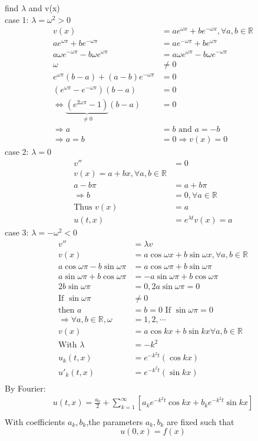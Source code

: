 find $ \lambda $ and v(x)\\
case 1: $ \lambda=\omega^2>0 $\\
\begin{align*}{}{}
v(x)&=ae^{\omega x}+be^{-\omega x},\forall a,b\in\mathbb{R}\\
ae^{\omega \pi}+be^{-\omega \pi}&=ae^{-\omega \pi}+be^{\omega \pi}\\
a\omega e^{-\omega \pi}-b\omega e^{\omega \pi}&=a\omega e^{\omega \pi}-b\omega e^{-\omega \pi}\\
\omega &\neq0\\
e^{\omega \pi}(b-a)+(a-b)e^{-\omega \pi}&=0\\
(e^{\omega \pi}-e^{-\omega \pi})(b-a)&=0\\
\Leftrightarrow \underbrace{(e^{2\omega \pi}-1)}_{\neq 0}(b-a)&=0\\
\Rightarrow a&=b \text{ and } a=-b\\
\Rightarrow a=b&=0 \Rightarrow v(x)=0
\end{align*}
case 2: $ \lambda=0 $\\
\begin{align*}{}{}
v''&=0\\
v(x)=a+bx,\forall a,b\in\mathbb{R}\\
a-b\pi&=a+b\pi\\
\Rightarrow b&=0,\forall a\in \mathbb{R}\\
\text{Thus } v(x)&=a\\
u(t,x)&=e^{\lambda t}v(x)=a
\end{align*}
case 3: $ \lambda=-\omega^2<0 $\\
\begin{align*}{}{}
v''&=\lambda v\\
v(x)&=a\cos{\omega x}+b\sin{\omega x},\forall a,b\in\mathbb{R}\\
a\cos{\omega \pi}-b\sin{\omega \pi}&=a\cos{\omega \pi}+b\sin{\omega \pi}\\
a\sin{\omega \pi}+b\cos{\omega \pi}&=-a\sin{\omega \pi}+b\cos{\omega \pi}\\
2b\sin{\omega \pi}&=0,2a\sin{\omega \pi}=0\\
\text{If } \sin{\omega \pi}&\neq0 \\
\text{then } a&=b=0\text{ If } \sin{\omega \pi}= 0 \\
 \Rightarrow \forall a, b\in \mathbb{R}, \omega&=1,2,\cdots \\
 v(x)&=a\cos{kx}+b\sin{kx} \forall a,b\in \mathbb{R}\\
 \text{With } \lambda&=-k^2\\
 u_k(t,x)&=e^{-k^2t}(\cos{kx})\\
 u'_k(t,x)&=e^{-k^2t}(\sin{kx})\\
\end{align*}
By Fourier:
\begin{align*}{}{}
u(t,x)=\frac{a_0}{2}+\sum_{k=1}^{\infty}[a_ke^{-k^2t}\cos{kx}+b_ke^{-k^2t}\sin{kx}]\\
\end{align*}
With coefficients $ a_k,b_k $,the parameters $ a_k,b_k $ are fixed such that$$
    u(0,x)=f(x)
$$ 
